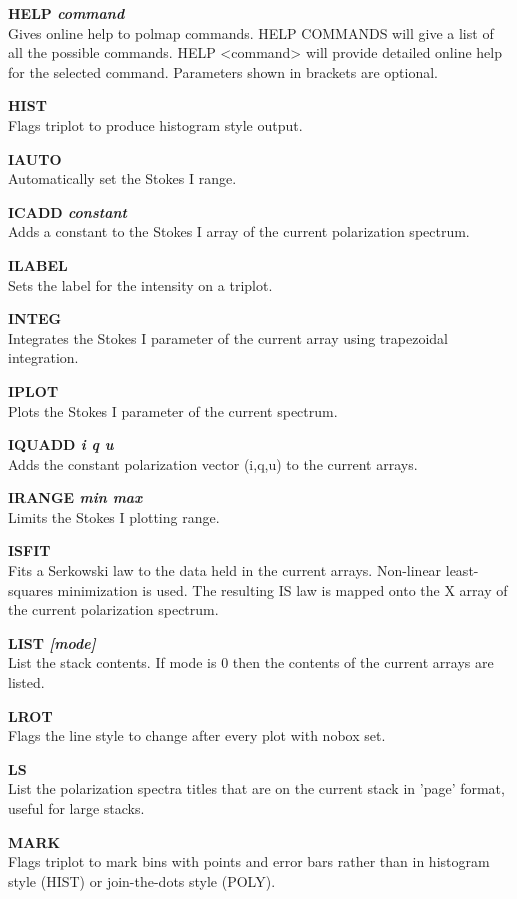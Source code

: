 {\bf HELP \it command} \\
Gives online help to polmap commands. HELP COMMANDS will give a list of
all the possible commands. HELP <command> will provide detailed online 
help for the selected command. Parameters shown in brackets are optional.

{\bf HIST} \\
Flags triplot to produce histogram style output.


{\bf IAUTO} \\
Automatically set the Stokes I range.

{\bf ICADD \it constant} \\
Adds a constant to the Stokes I array of the current polarization spectrum.

{\bf ILABEL} \\
Sets the label for the intensity on a triplot.

{\bf INTEG} \\
 Integrates the Stokes I parameter of the current array
using trapezoidal integration.

{\bf IPLOT } \\
Plots the Stokes I parameter of the current spectrum.

{\bf IQUADD \it i q u} \\
Adds the constant polarization vector (i,q,u) to the current arrays.

{\bf IRANGE \it  min max } \\
Limits the Stokes I  plotting range.

{\bf ISFIT} \\
Fits a Serkowski law to the data held in the current arrays.
Non-linear least-squares minimization is used.
The resulting IS law is mapped onto the X array of the current
polarization spectrum.

{\bf LIST \it  [mode] } \\
List the stack contents. If  mode is 0 then the contents of the current
arrays are listed.

{\bf LROT} \\
Flags the line style to change after every plot with nobox set.

{\bf LS} \\
List the polarization spectra titles that are on the current stack in
'page' format, useful for large stacks.

{\bf MARK} \\
Flags triplot to mark bins with points and error bars rather than in
histogram style (HIST) or join-the-dots style (POLY).

